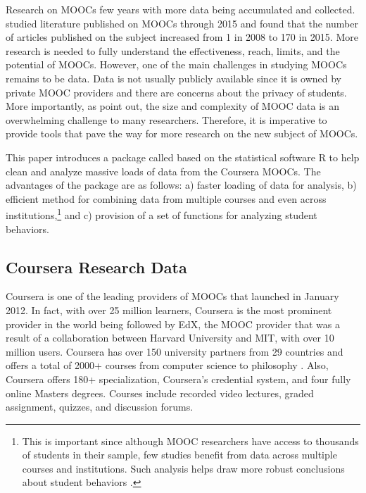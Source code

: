 Research on MOOCs few years with more data being accumulated and
collected. \cite{bozkurt2017trends} studied literature published on
MOOCs through 2015 and found that the number of articles published on
the subject increased from 1 in 2008 to 170 in 2015. More research is
needed to fully understand the effectiveness, reach, limits, and the
potential of MOOCs. However, one of the main challenges in studying
MOOCs remains to be data. Data is not usually publicly available since
it is owned by private MOOC providers and there are concerns about the
privacy of students. More importantly, as \cite{lopez2017google} point
out, the size and complexity of MOOC data is an overwhelming challenge
to many researchers. Therefore, it is imperative to provide tools that
pave the way for more research on the new subject of MOOCs.

This paper introduces a package called  \citep{crsra} based
on the statistical software R to help clean and analyze massive loads of
data from the Coursera MOOCs. The advantages of the package are as
follows: a) faster loading of data for analysis, b) efficient method for
combining data from multiple courses and even across
institutions,\footnote{This is important since although MOOC researchers have access to thousands of students in their sample, few studies benefit from data across multiple courses and institutions. Such analysis helps draw more robust conclusions about student behaviors \citep{reich2015rebooting}.}
and c) provision of a set of functions for analyzing student behaviors.

\subsection{Coursera Research Data}\label{coursera-research-data}

Coursera is one of the leading providers of MOOCs that launched in
January 2012. In fact, with over 25 million learners, Coursera is the
most prominent provider in the world being followed by EdX, the MOOC
provider that was a result of a collaboration between Harvard University
and MIT, with over 10 million users. Coursera has over 150 university
partners from 29 countries and offers a total of 2000+ courses from
computer science to philosophy \citep{coursera}. Also, Coursera offers
180+ specialization, Coursera's credential system, and four fully online
Masters degrees. Courses include recorded video lectures, graded
assignment, quizzes, and discussion forums.

